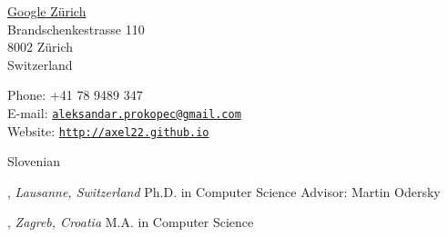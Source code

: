 \documentclass[9pt]{article}
\makeatletter
\def\myemail{aleksandar.prokopec@gmail.com}
\def\myweb{http://axel22.github.io}
\def\myphone{+41 78 9489 347}
\makeatother
\begin{document}
\begin{minipage}[t]{2.45in}
 \flushright \href{http://www.google.com/about/company/}{Google Zürich}
   {\footnotesize 
   \\ \vspace{-0.03in} Brandschenkestrasse 110
   \\ \vspace{-0.03in} 8002 Zürich \\ \vspace{-0.05in} Switzerland}

\end{minipage}
\hfill
\hfill
\begin{minipage}[t]{2.1in}
  \flushright \footnotesize Phone: \myphone \\
  E-mail: \texttt{\href{mailto:\myemail}{\myemail}} \\
  Website: \vspace{-0.03in} \texttt{\href{\myweb}{\myweb}}
\end{minipage}


\medskip
\medskip
\medskip

\reversemarginpar

\medskip

\medskip
{}

\noindent Slovenian

\bigskip



,
\emph{Lausanne, Switzerland} \vspace{0.01in} 
\newline Ph.D. in Computer Science
\newline Advisor: Martin Odersky
\bigskip

,
\emph{Zagreb, Croatia} \vspace{0.01in}
\newline\noindent M.A. in Computer Science
\bigskip
\end{document}
